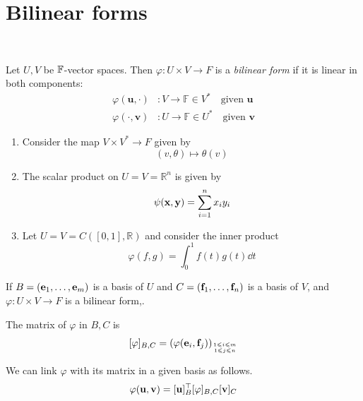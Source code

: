 \documentclass[a4paper,11pt]{article}
\begin{document}
\section{Bilinear forms}\ \vspace{-1.5em}
\begin{definition}
	Let $ U, V $ be $ {\mathbb{F}} $-vector spaces.
	Then $ \varphi \colon U \times V \to F $ is a \textit{bilinear form} if it is linear in both components:
    \begin{align*}
        \varphi(\mathbf{u},\cdot)&: V \to \mathbb{F} \in V^* \quad \text{given }\mathbf{u}\\
        \varphi(\cdot, \mathbf{v})&: U \to \mathbb{F} \in U^* \quad \text{given }\mathbf{v}
    \end{align*}
\end{definition}

\begin{example}
	\begin{enumerate}
        \item Consider the map $ V \times V^* \to F $ given by
        \[
            (v, \theta) \mapsto \theta(v)
        \]
    
        \item The scalar product on $ U = V = \mathbb R^n $ is given by
        \[
            \psi({\bf x}, {\bf y}) = \sum_{i=1}^n x_i y_i
        \]
    
        \item Let $ U = V = C([0,1], \mathbb R) $ and consider the inner product
        \[
            \varphi(f,g) = \int_0^1 f(t)g(t) \dd{t}
        \]
    \end{enumerate}
\end{example}

\begin{definition}
	If $ B = ({\bf e}_1, \dots, {\bf e}_m) $ is a basis of $ U $ and $ C = ({\bf f}_1, \dots, {\bf f}_n) $ is a basis of $ V $, and $ \varphi \colon U \times V \to F $ is a bilinear form,.
    
    The matrix of $ \varphi $ in $B,C$ is
	\[
		[\varphi]_{B, C} = \qty( \varphi({\bf e}_i, {\bf f}_j) )_{1 \leqslant i \leqslant m\atop 1 \leqslant j \leqslant n}
	\]
\end{definition}

\begin{lemma}
	We can link $ \varphi $ with its matrix in a given basis as follows.
	\[
		\varphi({\bf u},{\bf v}) = [{\bf u}]_B^\top [\varphi]_{B, C} [{\bf v}]_C
	\]
\end{lemma}
\end{document}
